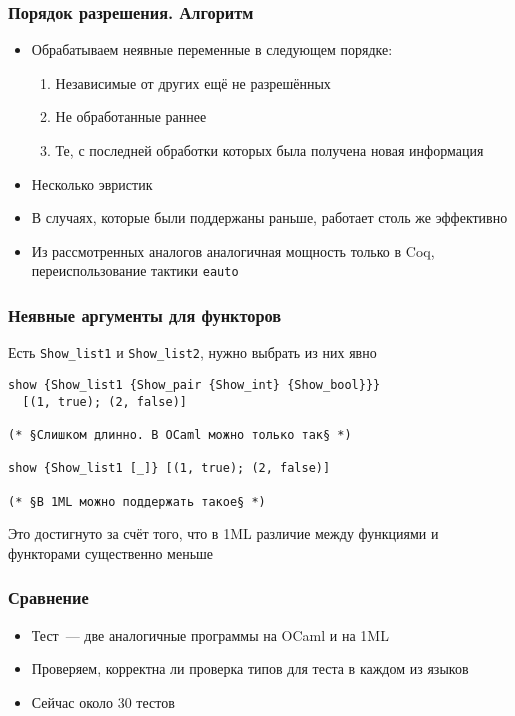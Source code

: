 \documentclass{beamer}
\begin{document}
\begin{frame}\frametitle{Порядок разрешения. Алгоритм}
\begin{itemize}
  \item Обрабатываем неявные переменные в следующем порядке:
  \begin{enumerate}
    \item Независимые от других ещё не разрешённых
    \item Не обработанные раннее
    \item Те, с последней обработки которых была получена новая информация
  \end{enumerate}
  \item Несколько эвристик
  \item В случаях, которые были поддержаны раньше, работает столь же эффективно
  \item Из рассмотренных аналогов аналогичная мощность только в Coq, переиспользование тактики \texttt{eauto} 
\end{itemize}
\end{frame}

\lstset{language=caml}
\begin{frame}[fragile]\frametitle{Неявные аргументы для функторов}
Есть \texttt{Show\_list1} и \texttt{Show\_list2}, нужно выбрать из них явно
\begin{lstlisting}
show {Show_list1 {Show_pair {Show_int} {Show_bool}}}
  [(1, true); (2, false)]

(* §Слишком длинно. В OCaml можно только так§ *)

show {Show_list1 [_]} [(1, true); (2, false)]

(* §В 1ML можно поддержать такое§ *)
\end{lstlisting}
Это достигнуто за счёт того, что в 1ML различие между функциями и функторами существенно меньше
\end{frame}

\begin{frame}\frametitle{Сравнение}
\begin{itemize}
  \item Тест~--- две аналогичные программы на OCaml и на 1ML
  \item Проверяем, корректна ли проверка типов для теста в каждом из языков
  \item Сейчас около 30 тестов
\end{itemize}
\end{frame}
\end{document}
